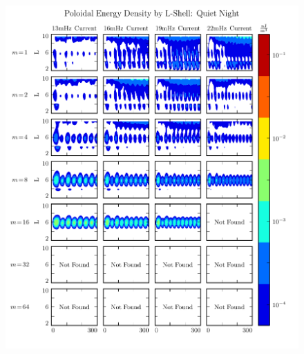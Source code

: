 \begin{figure}[!htb]
    \centering
    \includegraphics[width=\textwidth]{figures/layers_night_p.pdf}
    \caption[Nightside Poloidal Energy Distribution]{
      \todo{$\cdots$}
    }
    \label{fig_layers_night_p}
\end{figure}

